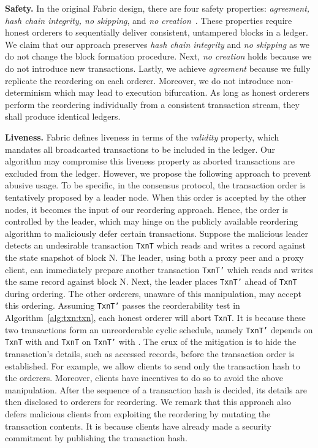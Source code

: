 {\textbf{Safety.} 
In the original Fabric design, there are four safety properties: \textit{agreement, hash chain integrity, no skipping}, and \textit{no creation}~\cite{androulaki2018hyperledger}. 
%
These properties require honest orderers to sequentially deliver consistent, untampered blocks in a ledger.
%
We claim that our approach preserves \textit{hash chain integrity} and \textit{no skipping} as we do not change the block formation procedure.
%
Next, \textit{no creation} holds because we do not introduce new transactions. 
%
Lastly, we achieve \textit{agreement} because we fully replicate the reordering on each orderer.
%
Moreover, we do not introduce non-determinism which may lead to execution bifurcation. 
%
As long as honest orderers perform the reordering individually from a consistent transaction stream, they shall produce identical ledgers. 

\textbf{Liveness.} 
Fabric defines liveness in terms of the \textit{validity} property, which mandates all broadcasted transactions to be included in the ledger. 
%
Our algorithm may compromise this liveness property as aborted transactions are excluded from the ledger. 
%
However, we propose the following approach to prevent abusive usage. 
%
To be specific, in the consensus protocol, the transaction order is tentatively proposed by a leader node. 
%
When this order is accepted by the other nodes, it becomes the input of our reordering approach. 
%
Hence, the order is controlled by the leader, which may hinge on the publicly available reordering algorithm to maliciously defer certain transactions.
% 
Suppose the malicious leader detects an undesirable transaction \texttt{TxnT} which reads and writes a record against the state snapshot of block N. 
%
The leader, using both a proxy peer and a proxy client, can immediately prepare another transaction \texttt{TxnT'} which reads and writes the same record against block N. 
%
Next, the leader places \texttt{TxnT'} ahead of \texttt{TxnT} during ordering. 
%
The other orderers, unaware of this manipulation, may accept this ordering.
% 
Assuming \texttt{TxnT'} passes the reorderability test in Algorithm~\ref{alg:txn:txn}, each honest orderer will abort \texttt{TxnT}.
%
It is because these two transactions form an unreorderable cyclic schedule, namely \texttt{TxnT'} depends on \texttt{TxnT} with  and \texttt{TxnT} on \texttt{TxnT'} with .
%
The crux of the mitigation is to hide the transaction's details, such as accessed records, before the transaction order is established. 
%
For example, we allow clients to send only the transaction hash to the orderers.
%
Moreover, clients have incentives to do so to avoid the above manipulation.
%
After the sequence of a transaction hash is decided, its details are then disclosed to orderers for reordering. 
%
We remark that this approach also defers malicious clients from exploiting the reordering by mutating the transaction contents.
%
It is because clients have already made a security commitment by publishing the transaction hash. 


}
